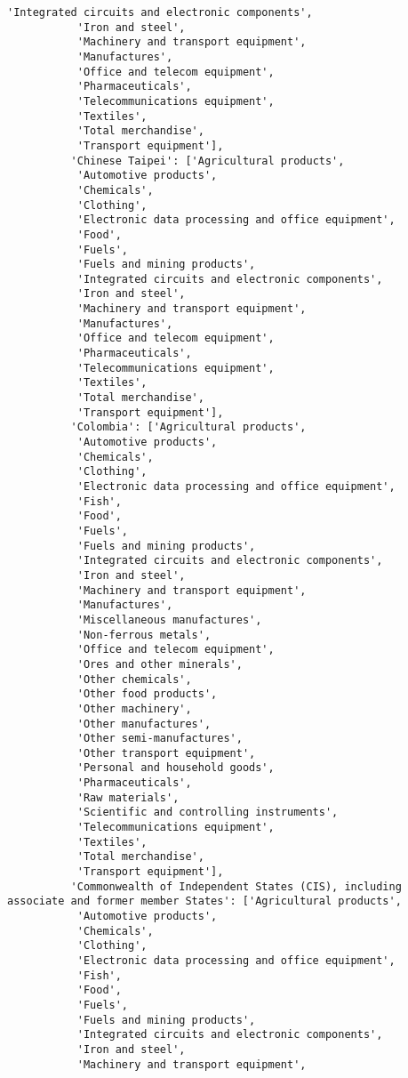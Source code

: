 \documentclass[11pt]{article}
\begin{document}
\begin{Verbatim}[commandchars=\\\{\}]
           'Integrated circuits and electronic components',
           'Iron and steel',
           'Machinery and transport equipment',
           'Manufactures',
           'Office and telecom equipment',
           'Pharmaceuticals',
           'Telecommunications equipment',
           'Textiles',
           'Total merchandise',
           'Transport equipment'],
          'Chinese Taipei': ['Agricultural products',
           'Automotive products',
           'Chemicals',
           'Clothing',
           'Electronic data processing and office equipment',
           'Food',
           'Fuels',
           'Fuels and mining products',
           'Integrated circuits and electronic components',
           'Iron and steel',
           'Machinery and transport equipment',
           'Manufactures',
           'Office and telecom equipment',
           'Pharmaceuticals',
           'Telecommunications equipment',
           'Textiles',
           'Total merchandise',
           'Transport equipment'],
          'Colombia': ['Agricultural products',
           'Automotive products',
           'Chemicals',
           'Clothing',
           'Electronic data processing and office equipment',
           'Fish',
           'Food',
           'Fuels',
           'Fuels and mining products',
           'Integrated circuits and electronic components',
           'Iron and steel',
           'Machinery and transport equipment',
           'Manufactures',
           'Miscellaneous manufactures',
           'Non-ferrous metals',
           'Office and telecom equipment',
           'Ores and other minerals',
           'Other chemicals',
           'Other food products',
           'Other machinery',
           'Other manufactures',
           'Other semi-manufactures',
           'Other transport equipment',
           'Personal and household goods',
           'Pharmaceuticals',
           'Raw materials',
           'Scientific and controlling instruments',
           'Telecommunications equipment',
           'Textiles',
           'Total merchandise',
           'Transport equipment'],
          'Commonwealth of Independent States (CIS), including associate and former member States': ['Agricultural products',
           'Automotive products',
           'Chemicals',
           'Clothing',
           'Electronic data processing and office equipment',
           'Fish',
           'Food',
           'Fuels',
           'Fuels and mining products',
           'Integrated circuits and electronic components',
           'Iron and steel',
           'Machinery and transport equipment',

\end{Verbatim}
\end{document}
